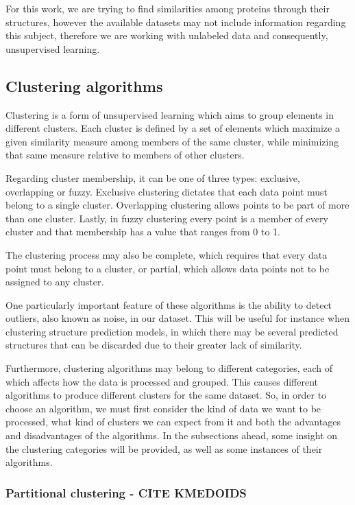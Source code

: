 For this work, we are trying to find similarities among proteins through their structures, however the available datasets may not include information regarding this subject, therefore we are working with unlabeled data and consequently, unsupervised learning.

\medskip
\subsection{Clustering algorithms}

Clustering is a form of unsupervised learning which aims to group elements in different clusters. Each cluster is defined by a set of elements which maximize a given similarity measure among members of the same cluster, while minimizing that same measure relative to members of other clusters.

Regarding cluster membership, it can be one of three types: exclusive, overlapping or fuzzy. Exclusive clustering dictates that each data point must belong to a single cluster. Overlapping clustering allows points to be part of more than one cluster. Lastly, in fuzzy clustering every point is a member of every cluster and that membership has a value that ranges from 0 to 1. 

The clustering process may also be complete, which requires that every data point must belong to a cluster, or partial, which allows data points not to be assigned to any cluster.

One particularly important feature of these algorithms is the ability to detect outliers, also known as noise, in our dataset. This will be useful for instance when clustering structure prediction models, in which there may be several predicted structures that can be discarded due to their greater lack of similarity.

Furthermore, clustering algorithms may belong to different categories, each of which affects how the data is processed and grouped. This causes different algorithms to produce different clusters for the same dataset. So, in order to choose an algorithm, we must first consider the kind of data we want to be processed, what kind of clusters we can expect from it and both the advantages and disadvantages of the algorithms. In the subsections ahead, some insight on the clustering categories will be provided, as well as some instances of their algorithms.

\medskip
\subsubsection{Partitional clustering - CITE KMEDOIDS}

